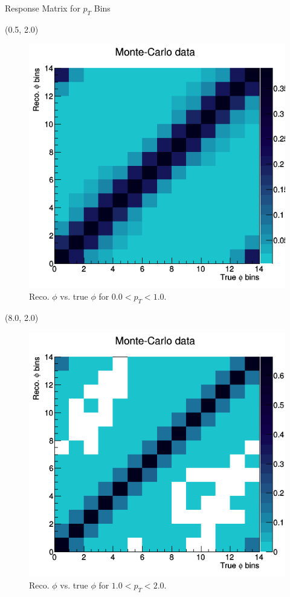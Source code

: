 \documentclass[11pt, xcolor={dvipsnames}, aspectratio = 169]{beamer}
\begin{document}
%
%
%
\begin{frame}{Response Matrix for $p_{T}$ Bins}

\begin{textblock}{7.0}(0.5, 2.0)
\begin{figure}
    \centering
    \includegraphics[width = 1.0\linewidth]{imgs/matrix_pt0.png}
    \caption{Reco. $\phi$ vs. true $\phi$ for $0.0 < p_{T} < 1.0$.}
\end{figure}
\end{textblock}

\begin{textblock}{7.0}(8.0, 2.0)
\begin{figure}
    \centering
    \includegraphics[width = 1.0\linewidth]{imgs/matrix_pt1.png}
    \caption{Reco. $\phi$ vs. true $\phi$ for $1.0 < p_{T} < 2.0$.}
\end{figure}
\end{textblock}

\end{frame}
\end{document}
